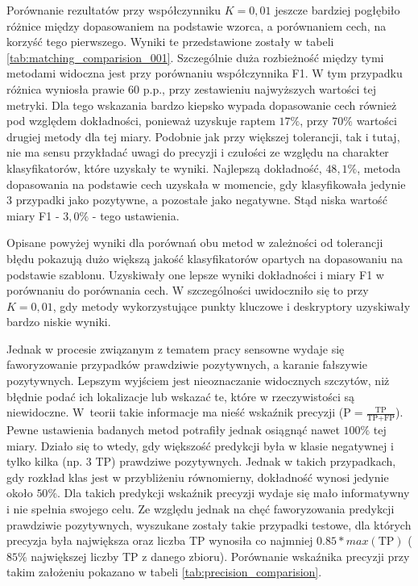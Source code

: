 

Porównanie rezultatów przy współczynniku $K=0,01$ jeszcze bardziej pogłębiło różnice między dopasowaniem na podstawie wzorca, a porównaniem cech, na korzyść tego pierwszego. Wyniki te przedstawione zostały w tabeli \ref{tab:matching_comparision_001}. Szczególnie duża rozbieżność między tymi metodami widoczna jest przy porównaniu współczynnika F1. W tym przypadku różnica wyniosła prawie $60$ p.p., przy zestawieniu najwyższych wartości tej metryki. Dla tego wskazania bardzo kiepsko wypada dopasowanie cech również pod względem dokładności, ponieważ uzyskuje raptem $17\%$, przy $70\%$ wartości drugiej metody dla tej miary. Podobnie jak przy większej tolerancji, tak i tutaj, nie ma sensu przykładać uwagi do precyzji i czułości ze względu na charakter klasyfikatorów, które uzyskały te wyniki. Najlepszą dokładność, $48,1\%$, metoda dopasowania na podstawie cech uzyskała w momencie, gdy klasyfikowała jedynie $3$ przypadki jako pozytywne, a pozostałe jako negatywne. Stąd niska wartość miary F1 -  $3,0\%$ - tego ustawienia. 



Opisane powyżej wyniki dla porównań obu metod w zależności od tolerancji błędu pokazują dużo większą jakość klasyfikatorów opartych na dopasowaniu na podstawie szablonu. Uzyskiwały one lepsze wyniki dokładności i miary F1 w porównaniu do porównania cech. W szczególności uwidoczniło się to przy $K=0,01$, gdy metody wykorzystujące punkty kluczowe i deskryptory uzyskiwały bardzo niskie wyniki.



 Jednak w procesie związanym z tematem pracy sensowne wydaje się faworyzowanie przypadków prawdziwie pozytywnych, a karanie fałszywie pozytywnych. Lepszym wyjściem jest nieoznaczanie widocznych szczytów, niż błędnie podać ich lokalizacje lub wskazać te, które w rzeczywistości są niewidoczne. W~teorii takie informacje ma nieść wskaźnik precyzji ($\textrm{P}=\frac{\textrm{TP}}{\textrm{TP}+\textrm{FP}}$). Pewne ustawienia badanych metod potrafiły jednak osiągnąć nawet $100\%$ tej miary. Działo się to wtedy, gdy większość predykcji była w klasie negatywnej i tylko kilka (np. $3$ TP) prawdziwe pozytywnych. Jednak w takich przypadkach, gdy rozkład klas jest w przybliżeniu równomierny, dokładność wynosi jedynie około $50\%$. Dla takich predykcji wskaźnik precyzji wydaje się mało informatywny i nie spełnia swojego celu. Ze względu jednak na chęć faworyzowania predykcji prawdziwie pozytywnych, wyszukane zostały takie przypadki testowe, dla których precyzja była największa oraz liczba TP wynosiła co najmniej $0.85*max(\textrm{TP})$ ($85\%$ największej liczby TP z danego zbioru). Porównanie wskaźnika precyzji przy takim założeniu pokazano w tabeli \ref{tab:precision_comparision}.

